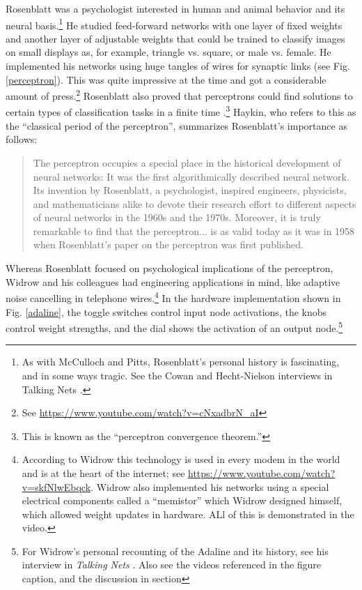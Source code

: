 Rosenblatt was a psychologist interested in human and animal behavior and its neural basis.\footnote{As with McCulloch and Pitts, Rosenblatt's personal history is fascinating, and in some ways tragic. See the Cowan and Hecht-Nielson interviews in Talking Nets \cite{anderson2000talking}.} He studied feed-forward networks with one layer of fixed weights and another layer of adjustable weights that could be trained to classify images on small displays as, for example, triangle vs. square, or male vs. female. He implemented his networks using huge tangles of wires for synaptic links (see Fig. \ref{perceptron}). This was quite impressive at the time and got a considerable amount of press.\footnote{See \url{https://www.youtube.com/watch?v=cNxadbrN_aI}} Rosenblatt also proved that perceptrons could find solutions to certain types of classification tasks in a finite time \cite{rosenblatt1962comparison}.\footnote{This is known as the ``perceptron convergence theorem.''} Haykin, who refers to this as the ``classical period of the perceptron'', summarizes Rosenblatt's importance as follows:
\begin{quotation}
The perceptron occupies a special place in the historical development of neural networks: It was the first algorithmically described neural network. Its invention by Rosenblatt, a psychologist, inspired engineers, physicists, and mathematicians alike to devote their research effort to different aspects of neural networks in the 1960s and the 1970s. Moreover, it is truly remarkable to find that the perceptron... is as valid today as it was in 1958 when Rosenblatt's paper on the perceptron was first published.
\end{quotation}

Whereas Rosenblatt focused on psychological implications of the perceptron, Widrow and his colleagues had engineering applications in mind, like adaptive noise cancelling in telephone wires.\footnote{According to Widrow this technology is used in every modem in the world and is at the heart of the internet; see \url{https://www.youtube.com/watch?v=skfNlwEbqck}. Widrow also implemented his networks using a special electrical components called a ``memistor'' which Widrow designed himself, which allowed weight updates in hardware. ALl of this is demonstrated in the video.} In the hardware implementation shown in Fig. \ref{adaline}, the toggle switches control input node activations, the knobs control weight strengths, and the dial shows the activation of an output node.\footnote{For Widrow's personal recounting of the Adaline and its history, see his interview in \emph{Talking Nets} \cite{anderson2000talking}. Also see the videos referenced in the figure caption, and the discussion in section }

